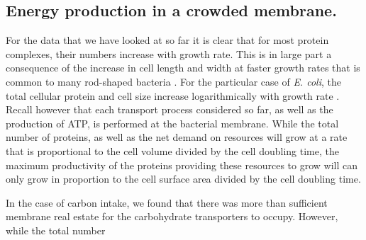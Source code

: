 \subsection{Energy production in a crowded membrane.}

For the data that we have looked at so far it is clear that for most protein
complexes, their numbers increase with growth rate. This is in large part a
consequence of the increase in cell length and width at faster growth rates that
is common to many rod-shaped bacteria \citep{ojkic2019, harris2018}. For the
particular case of  \textit{E. coli}, the total cellular protein and cell size
increase logarithmically with growth rate \citep{schaechter1958, si2017}. Recall
however that each transport process considered so far, as well as the production
of ATP, is performed at the bacterial membrane. While the total number of
proteins, as well as the net demand on resources will grow at a rate that is
proportional to the cell volume divided by the cell doubling time, the maximum
productivity of the proteins providing these resources to grow will can only
grow in proportion to the cell surface area divided by the cell doubling time. 


In the case of carbon intake, we found that there was more than sufficient membrane real estate for the carbohydrate transporters to occupy. However, while the total number


%
%
%






\begin{figure}
    \begin{fullwidth}
    \end{fullwidth}
\end{figure}
